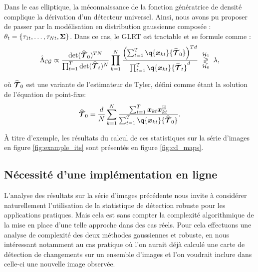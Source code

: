 Dans le cas elliptique, la méconnaissance de la fonction génératrice de densité complique la dérivation d'un détecteur universel. Ainsi, nous avons pu proposer de passer par la modélisation en distribution gaussienne composée : $\theta_t = \{\tau_{1t},\dots,\tau_{Nt}, \boldsymbol{\Sigma}\}$. Dans ce cas, le GLRT est tractable et se formule comme \cite{Mian_2019}:
\begin{equation}
  \DetectorStat_\compoundgaussian \propto \dfrac{\Det(\Tyler_0)^{\Ntime\Nobs}}{\prod_{\itime=1}^{\Ntime} \Det(\Tyler_t)^{\Nobs}} \prod_{\iobs=1}^{\Nobs} \dfrac{\left(\sum_{\itime=1}^{\Ntime}\q{\x_{\iobs\itime}}{\Tyler_0}\right)^{\Ntime\vdim}}{\prod_{\itime=1}^{\Ntime}\q{\x_{\iobs\itime}}{\Tyler_t}^{\vdim}} \detect,
  \label{eq:glrt_nongaussian_cd}
\end{equation}

où $\widehat{\bm{\mathcal{T}}}_0$ est une variante de l'estimateur de Tyler, défini comme étant la solution de l'équation de point-fixe:
\begin{equation}
  \Tyler_0 = \frac{\vdim}{\Nobs} \sum_{\iobs=1}^{\Nobs} \dfrac{\sum_{\itime=1}^{\Ntime} \x_{\iobs\itime}\x_{\iobs\itime}^\herm}{\sum_{\itime=1}^{\Ntime} \q{\x_{\iobs\itime}}{\Tyler_0}}.
\end{equation}


À titre d'exemple, les résultats du calcul de ces statistiques sur la série d'images en figure \ref{fig:example_its} sont présentés en figure \ref{fig:cd_maps}.


\subsection{Nécessité d'une implémentation en ligne}

L'analyse des résultats sur la série d'images précédente nous invite à considérer naturellement l'utilisation de la statistique de détection robuste pour les applications pratiques. Mais cela est sans compter la complexité algorithmique de la mise en place d'une telle approche dans des cas réels. Pour cela effectuons une analyse de complexité des deux méthodes gaussiennes et robuste, en nous intéressant notamment au cas pratique où l'on aurait déjà calculé une carte de détection de changements sur un ensemble d'images et l'on voudrait inclure dans celle-ci une nouvelle image observée.

